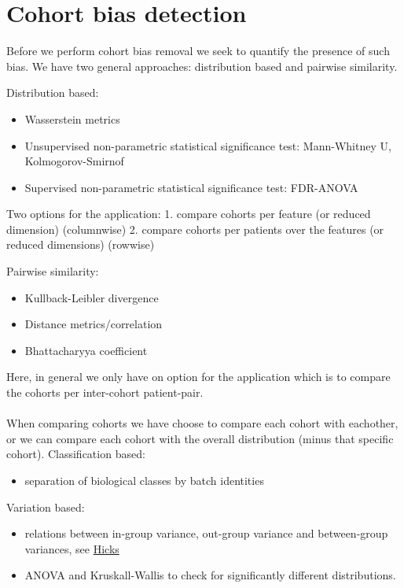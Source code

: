 \documentclass[a4paper,10pt]{article}
\begin{document}
\section{Cohort bias detection}
%
Before we perform cohort bias removal we seek to quantify the presence of such bias.
We have two general approaches: distribution based and pairwise similarity.

Distribution based: 
\begin{itemize}
 \item Wasserstein metrics
 \item Unsupervised non-parametric statistical significance test: Mann-Whitney U, Kolmogorov-Smirnof
 \item Supervised non-parametric statistical significance test: FDR-ANOVA
\end{itemize}
%
Two options for the application:
1. compare cohorts per feature (or reduced dimension) (columnwise)
2. compare cohorts per patients over the features (or reduced dimensions) (rowwise)

Pairwise similarity:
\begin{itemize}
 \item Kullback-Leibler divergence
 \item Distance metrics/correlation
 \item Bhattacharyya coefficient
\end{itemize}
%
Here, in general we only have on option for the application which is to compare the cohorts per inter-cohort patient-pair.\\\\
When comparing cohorts we have choose to compare each cohort with eachother, or we can compare each cohort with the overall distribution (minus that specific cohort).
%
Classification based:
\begin{itemize}
 \item separation of biological classes by batch identities
\end{itemize}
%
Variation based:
\begin{itemize}
 \item relations between in-group variance, out-group variance and between-group variances,
 see \href{https://www.biorxiv.org/content/biorxiv/early/2014/12/04/012203.full.pdf}{Hicks}
 \item ANOVA and Kruskall-Wallis to check for significantly different distributions.
\end{itemize}
\end{document}
